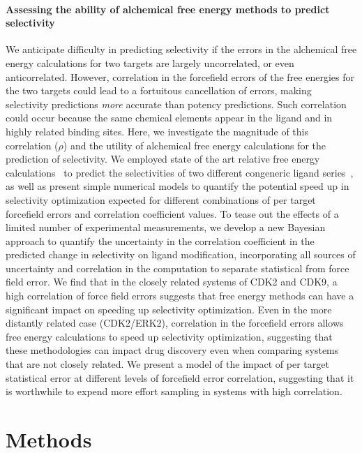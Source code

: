 \documentclass[9pt,lineno]{elife-modified} %
\begin{document}
\paragraph{Assessing the ability of alchemical free energy methods to predict selectivity}
We anticipate difficulty in predicting selectivity if the errors in the alchemical free energy calculations for two targets are largely uncorrelated, or even anticorrelated. However, correlation in the forcefield errors of the free energies for the two targets could lead to a fortuitous cancellation of errors, making selectivity predictions \emph{more} accurate than potency predictions. Such correlation could occur because the same chemical elements appear in the ligand and in highly related binding sites. 
Here, we investigate the magnitude of this correlation ($\rho$) and the utility of alchemical free energy calculations for the prediction of selectivity. We employed state of the art relative free energy calculations~\citep{Wang:J.Am.Chem.Soc.:2015,Abel:2017jt} to predict the selectivities of two different congeneric ligand series~\citep{Shao2013-oe, Blake2016-su}, as well as present simple numerical models to quantify the potential speed up in selectivity optimization expected for different combinations of per target forcefield errors and correlation coefficient values. To tease out the effects of a limited number of experimental measurements, we develop a new Bayesian approach to quantify the uncertainty in the correlation coefficient in the predicted change in selectivity on ligand modification, incorporating all sources of uncertainty and correlation in the computation to separate statistical from force field error. We find that in the closely related systems of CDK2 and CDK9, a high correlation of force field errors suggests that free energy methods can have a significant impact on speeding up selectivity optimization. Even in the more distantly related case (CDK2/ERK2), correlation in the forcefield errors allows free energy calculations to speed up selectivity optimization, suggesting that these methodologies can impact drug discovery even when comparing systems that are not closely related. We present a model of the impact of per target statistical error at different levels of forcefield error correlation, suggesting that it is worthwhile to expend more effort sampling in systems with high correlation. 

   
%
%
%
%
\section{Methods}
\end{document}
